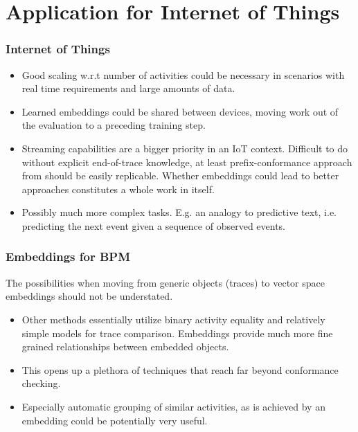 \documentclass{beamer}
\begin{document}
	\section{Application for Internet of Things}
	\begin{frame}
		\frametitle{Internet of Things}
		\begin{itemize}
			\item Good scaling w.r.t number of activities could be necessary in scenarios with real time requirements and large amounts of data.
			\item Learned embeddings could be shared between devices, moving work out of the evaluation to a preceding training step.
			\item Streaming capabilities are a bigger priority in an IoT context. Difficult to do without explicit end-of-trace knowledge, at least prefix-conformance approach from \cite{ZBK*19} should be easily replicable. Whether embeddings could lead to better approaches constitutes a whole work in itself.
			\item Possibly much more complex tasks. E.g. an analogy to predictive text, i.e. predicting the next event given a sequence of observed events.
		\end{itemize}
	\end{frame}

\begin{frame}
	\frametitle{Embeddings for BPM}
	The possibilities when moving from generic objects (traces) to vector space embeddings should not be understated.
	
	\begin{itemize}
		\item Other methods essentially utilize binary activity equality and relatively simple models for trace comparison. Embeddings provide much more fine grained relationships between embedded objects.
		\item This opens up a plethora of techniques that reach far beyond conformance checking.
		\item Especially automatic grouping of similar activities, as is achieved by an embedding could be potentially very useful.
	\end{itemize}
	 
\end{frame}
\end{document}
